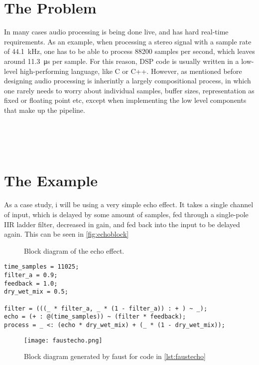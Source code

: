 \section{The Problem}

In many cases audio processing is being done live, and has hard real-time requirements. As an example, when processing
a stereo signal with a sample rate of \SI{44.1}{kHz}, one has to be able to process \num{88200} samples per second,
which leaves around \SI{11.3}{\micro\second} per sample. For this reason, DSP code is usually written in a low-level
high-performing language, like C or C++. However, as mentioned before designing audio processing is inherintly a
largely compositional process, in which one rarely needs to worry about individual samples, buffer sizes,
representation as fixed or floating point etc, except when implementing the low level components that make up the
pipeline.

 \\
 \\
 \\

\section{The Example}

As a case study, i will be using a very simple echo effect. It takes a single channel of input, which is delayed by
some amount of samples, fed through a single-pole IIR ladder filter, decreased in gain, and fed back into the input to
be delayed again. This can be seen in \autoref{fig:echoblock}

\begin{figure}
  \centering
  
  \caption{Block diagram of the echo effect.}
  \label{fig:echoblock}
\end{figure}

\begin{lstlisting}[language=faust,label=lst:faustecho,caption={
    Simple echo effect in faust, with time control, a 1-pole IIR filter, feedback gain and a dry/wet mix control. Paste into \url{https://faustide.grame.fr} to run the example.
}]
time_samples = 11025;
filter_a = 0.9;
feedback = 1.0; 
dry_wet_mix = 0.5;

filter = (((_ * filter_a, _ * (1 - filter_a)) : + ) ~ _);
echo = (+ : @(time_samples)) ~ (filter * feedback);
process = _ <: (echo * dry_wet_mix) + (_ * (1 - dry_wet_mix));
\end{lstlisting}

\begin{figure}
  \centering
  \def\svgwidth{\columnwidth}
  \texttt{[image: faustecho.png]}
  \caption{Block diagram generated by faust for code in \autoref{lst:faustecho}}
  \label{fig:faustecho}
\end{figure}
